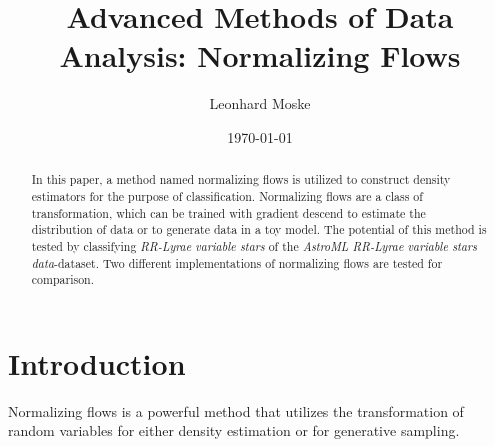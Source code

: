 \documentclass[%
 reprint,
 amsmath,amssymb,
 aps,
]{revtex4-2}
\begin{document}
\title{Advanced Methods of Data Analysis: Normalizing Flows}%

\author{Leonhard Moske}



\date{\today}%

\begin{abstract}

In this paper, a method named normalizing flows is utilized to construct density estimators for the purpose of classification. Normalizing flows are a class of transformation, which can be trained with gradient descend to estimate the distribution of data or to generate data in a toy model. The potential of this method is tested by classifying \textit{RR-Lyrae variable stars} of the \textit{AstroML RR-Lyrae variable stars data}-dataset.
Two different implementations of normalizing flows are tested for comparison.

\end{abstract}
\maketitle


\section{Introduction}
Normalizing flows is a powerful method that utilizes the transformation of random variables for either density estimation or for generative sampling.
\end{document}
